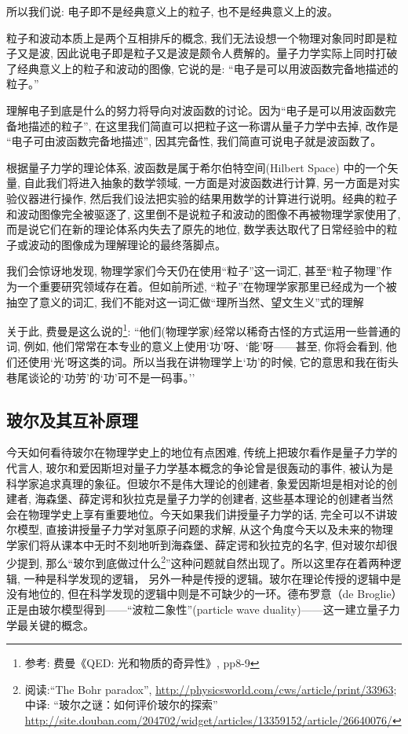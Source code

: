 所以我们说: 电子即不是经典意义上的粒子, 也不是经典意义上的波。

粒子和波动本质上是两个互相排斥的概念,
我们无法设想一个物理对象同时即是粒子又是波,
因此说电子即是粒子又是波是颇令人费解的。量子力学实际上同时打破了经典意义上的粒子和波动的图像,
它说的是: ``电子是可以用波函数完备地描述的粒子。''

理解电子到底是什么的努力将导向对波函数的讨论。因为``电子是可以用波函数完备地描述的粒子'',
在这里我们简直可以把粒子这一称谓从量子力学中去掉, 改作是
``电子可由波函数完备地描述'', 因其完备性,
我们简直可说电子就是波函数了。

根据量子力学的理论体系, 波函数是属于希尔伯特空间(Hilbert Space)
中的一个矢量, 自此我们将进入抽象的数学领域,
一方面是对波函数进行计算, 另一方面是对实验仪器进行操作,
然后我们设法把实验的结果用数学的计算进行说明。经典的粒子和波动图像完全被驱逐了,
这里倒不是说粒子和波动的图像不再被物理学家使用了,
而是说它们在新的理论体系内失去了原先的地位,
数学表达取代了日常经验中的粒子或波动的图像成为理解理论的最终落脚点。

我们会惊讶地发现, 物理学家们今天仍在使用``粒子''这一词汇,
甚至``粒子物理''作为一个重要研究领域存在着。但如前所述,
``粒子''在物理学家那里已经成为一个被抽空了意义的词汇,
我们不能对这一词汇做``理所当然、望文生义''式的理解

关于此, 费曼是这么说的\footnote{参考: 费曼《QED: 光和物质的奇异性》,
pp8-9}: ``他们(物理学家)经常以稀奇古怪的方式运用一些普通的词, 例如,
他们常常在本专业的意义上使用`功'呀、`能'呀——甚至, 你将会看到,
他们还使用`光'呀这类的词。所以当我在讲物理学上`功'的时候,
它的意思和我在街头巷尾谈论的`功劳'的`功'可不是一码事。''


\subsection{玻尔及其互补原理}


今天如何看待玻尔在物理学史上的地位有点困难,
传统上把玻尔看作是量子力学的代言人,
玻尔和爱因斯坦对量子力学基本概念的争论曾是很轰动的事件,
被认为是科学家追求真理的象征。但玻尔不是伟大理论的创建者,
象爱因斯坦是相对论的创建者,
海森堡、薛定谔和狄拉克是量子力学的创建者,
这些基本理论的创建者当然会在物理学史上享有重要地位。今天如果我们讲授量子力学的话,
完全可以不讲玻尔模型, 直接讲授量子力学对氢原子问题的求解,
从这个角度今天以及未来的物理学家们将从课本中无时不刻地听到海森堡、薛定谔和狄拉克的名字,
但对玻尔却很少提到, 那么``玻尔到底做过什么\footnote{阅读:``The Bohr
paradox'', \url{http://physicsworld.com/cws/article/print/33963};
中译: ``玻尔之谜：如何评价玻尔的探索''
\url{http://site.douban.com/204702/widget/articles/13359152/article/26640076/}
}''这种问题就自然出现了。所以这里存在着两种逻辑,
一种是科学发现的逻辑，
另外一种是传授的逻辑。玻尔在理论传授的逻辑中是没有地位的,
但在科学发现的逻辑中则是不可缺少的一环。德布罗意（de
Broglie）正是由玻尔模型得到——``波粒二象性''(particle wave
duality)——这一建立量子力学最关键的概念。

